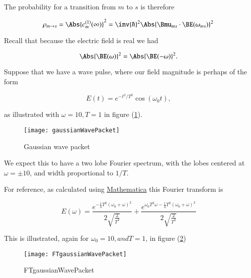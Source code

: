 The probability for a transition from $m$ to $s$ is therefore

\begin{equation}\label{eqn:qmTwoL8:70}
\rho_{m \rightarrow s} = \Abs{ c_m^{(1)}(\infty) }^2
= \inv{\hbar}^2 \Abs{\Bmu_{ms} \cdot \BE(\omega_{ms})}^2
\end{equation}

Recall that because the electric field is real we had

\begin{equation}\label{eqn:qmTwoL8:90}
\Abs{\BE(\omega)}^2 = \Abs{\BE(-\omega)}^2.
\end{equation}

Suppose that we have a wave pulse, where our field magnitude is perhaps of the form

\begin{equation}\label{eqn:qmTwoL8:110}
E(t) = e^{-t^2/T^2} \cos(\omega_0 t),
\end{equation}

as illustrated with $\omega = 10, T = 1$ in figure (\ref{fig:gaussianWavePacket}).

\begin{figure}[htp]
\centering
\texttt{[image: gaussianWavePacket]}
\caption{Gaussian wave packet}\label{fig:gaussianWavePacket}
\end{figure}

We expect this to have a two lobe Fourier spectrum, with the lobes centered at $\omega = \pm 10$, and width proportional to $1/T$.

For reference, as calculated using \href{https://github.com/peeterjoot/physicsplay/tree/master/notes/phy456/qmTwoL8figures.nb}{Mathematica} this Fourier transform is

\begin{equation}\label{eqn:qmTwoL8:130}
E(\omega) = \frac{e^{-\frac{1}{4} T^2 (\omega_0+\omega )^2}}{2 \sqrt{\frac{2}{T^2}}}+\frac{e^{\omega_0 T^2 \omega -\frac{1}{4} T^2 (\omega_0+\omega )^2}}{2 \sqrt{\frac{2}{T^2}}}
\end{equation}

This is illustrated, again for $\omega_0 = 10, and T=1$, in figure (\ref{fig:FTgaussianWavePacket})

\begin{figure}[htp]
\centering
\texttt{[image: FTgaussianWavePacket]}
\caption{FTgaussianWavePacket}\label{fig:FTgaussianWavePacket}
\end{figure}

